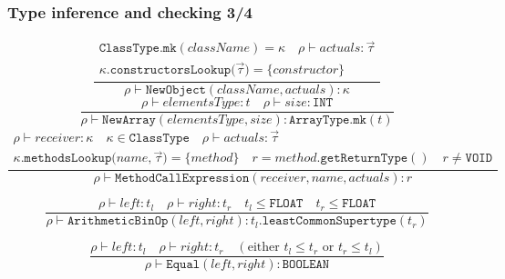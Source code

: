 \documentclass[11pt]{beamer}  %
\begin{document}
\begin{frame}[fragile]\frametitle{Type inference and checking 3/4}

\[
    \frac{\begin{array}{c}
          \mathtt{ClassType.mk(\mathit{className})}=\kappa\quad
            \rho\vdash\mathit{actuals}:\vec{\tau}\\
          \kappa\mathtt{.constructorsLookup(}\vec{\tau})=
            \{\mathit{constructor}\}
          \end{array}}
         {\rho\vdash\mathtt{NewObject(\mathit{className},\mathit{actuals})}:
          \kappa}
  \]
  \[
    \frac{\rho\vdash\mathit{elementsType}:t\quad\rho\vdash\mathit{size}:
          \mathtt{INT}}
         {\rho\vdash\mathtt{NewArray(\mathit{elementsType},\mathit{size})}:
          \mathtt{ArrayType.mk(\mathit{t})}}
  \]
  \[
     \frac{\begin{array}{c}
       \rho\vdash\mathit{receiver}:\kappa\quad\kappa\in\mathtt{ClassType}
         \quad\rho\vdash\mathit{actuals}:\vec{\tau}\\
       \kappa\mathtt{.methodsLookup(\mathit{name},}\vec{\tau})=
           \{\mathit{method}\}\quad
         r=\mathit{method}\mathtt{.getReturnType()}
           \quad r\not=\mathtt{VOID}
       \end{array}}
          {\rho\vdash\mathtt{MethodCallExpression(\mathit{receiver},
           \mathit{name},\mathit{actuals})}:r}
  \]

\[
    \frac{\rho\vdash\mathit{left}:t_l\quad
          \rho\vdash\mathit{right}:t_r\quad t_l\le\mathtt{FLOAT}
          \quad t_r\le\mathtt{FLOAT}}
         {\rho\vdash\mathtt{ArithmeticBinOp(\mathit{left},\mathit{right})}:
          t_l\mathtt{.leastCommonSupertype(\mathit{t_r})}}
  \]

  \[
    \frac{\rho\vdash\mathit{left}:t_l\quad
          \rho\vdash\mathit{right}:t_r\quad (\text{either }t_l\le t_r\text{ or }
          t_r\le t_l)}
         {\rho\vdash\mathtt{Equal(\mathit{left},\mathit{right})}:
           \mathtt{BOOLEAN}}
  \]

\end{frame}
\end{document}
